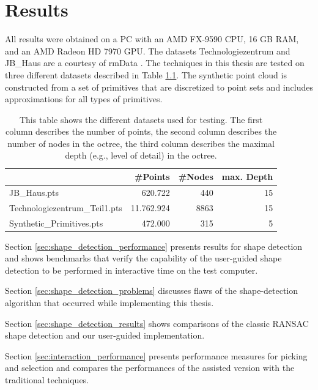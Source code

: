 \chapter{Results}
\label{chap:results}

All results were obtained on a PC with an AMD FX-9590 CPU, 16 GB RAM, and an AMD Radeon HD 7970 GPU. The datasets Technologiezentrum and JB\_Haus are a courtesy of rmData \cite{rmdata}. The techniques in this thesis are tested on three different datasets described in Table \ref{tab:datasets}. The synthetic point cloud is constructed from a set of primitives that are discretized to point sets and includes approximations for all types of primitives. 

\begin{table}
\centering
\begin{tabular}{ l | r | r | r }
                        & \textbf{\#Points} & \textbf{\#Nodes}    & \textbf{max. Depth} \\
    \hline
  JB\_Haus.pts                  & 620.722           & 440   & 15 \\
  Technologiezentrum\_Teil1.pts    & 11.762.924        & 8863  & 15 \\
  Synthetic\_Primitives.pts     & 472.000           & 315   & 5 \\
\end{tabular}
\caption[Table of point-cloud datasets]
{This table shows the different datasets used for testing. The first column describes the number of points, the second column describes the number of nodes in the octree, the third column describes the maximal depth (e.g., level of detail) in the octree. } 
\label{tab:datasets}
\end{table}


Section \ref{sec:shape_detection_performance} presents results for shape detection and shows benchmarks that verify the capability of the user-guided shape detection to be performed in interactive time on the test computer.

Section \ref{sec:shape_detection_problems} discusses flaws of the shape-detection algorithm that occurred while implementing this thesis.

Section \ref{sec:shape_detection_results} shows comparisons of the classic RANSAC shape detection and our user-guided implementation. 

Section \ref{sec:interaction_performance} presents performance measures for picking and selection and compares the performances of the assisted version with the traditional techniques. 

